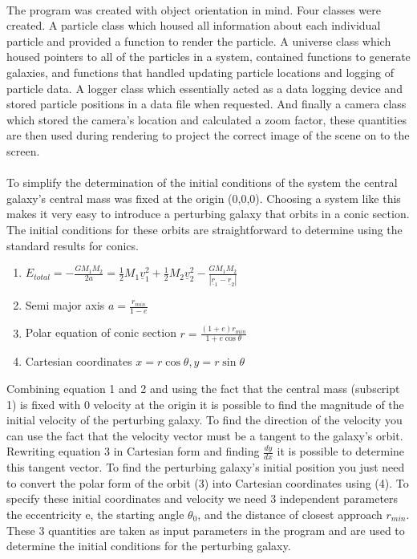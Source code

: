 \documentclass[10pt,a4paper]{article}
\begin{document}
\\
The program was created with object orientation in mind. Four classes were created. A particle class which housed all information about each individual particle and provided a function to render the particle. A universe class which housed pointers to all of the particles in a system, contained functions to generate galaxies, and functions that handled updating particle locations and logging of particle data. A logger class which essentially acted as a data logging device and stored particle positions in a data file when requested. And finally a camera class which stored the camera's location and calculated a zoom factor, these quantities are then used during rendering to project the correct image of the scene on to the screen.
\\
\\
To simplify the determination of the initial conditions of the system the central galaxy's central mass was fixed at the origin (0,0,0). Choosing a system like this makes it very easy to introduce a perturbing galaxy that orbits in a conic section. The initial conditions for these orbits are straightforward to determine using the standard results for conics.

\begin{enumerate}
\item $E_{total} = -\frac{G M_1 M_2}{2 a} =\frac{1}{2} M_1 \underline{v}_1^2 + \frac{1}{2} M_2 \underline{v}_2^2 -\frac{G M_1 M_2}{|\underline{r}_1-\underline{r}_2|}$
\item Semi major axis $a = \frac{r_{min}}{1-e}$
\item Polar equation of conic section $r = \frac{(1+e)r_{min}}{1+e\cos{\theta}}$
\item Cartesian coordinates $x=r\cos{\theta},y=r\sin{\theta}$
\end{enumerate}

Combining equation 1 and 2 and using the fact that the central mass (subscript 1) is fixed with 0 velocity at the origin it is possible to find the magnitude of the initial velocity of the perturbing galaxy. To find the direction of the velocity you can use the fact that the velocity vector must be a tangent to the galaxy's orbit. Rewriting equation 3 in Cartesian form and finding $\frac{dy}{dx}$ it is possible to determine this tangent vector. To find the perturbing galaxy's initial position you just need to convert the polar form of the orbit (3) into Cartesian coordinates using (4). To specify these initial coordinates and velocity we need 3 independent parameters the eccentricity e, the starting angle $\theta_0$, and the distance of closest approach $r_{min}$. These 3 quantities are taken as input parameters in the program and are used to determine the initial conditions for the perturbing galaxy.
\end{document}
